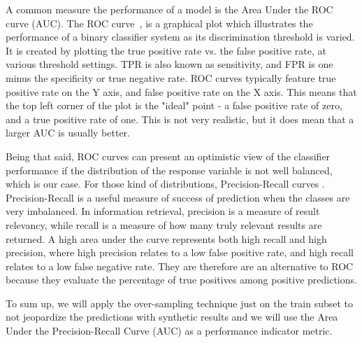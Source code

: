 A common measure the performance of a model is the Area Under the ROC curve (AUC). The ROC curve~\cite{roc}, is a graphical plot which illustrates the performance of a binary classifier system as its discrimination threshold is varied. It is created by plotting the true positive rate vs. the false positive rate, at various threshold settings. TPR is also known as sensitivity, and FPR is one minus the specificity or true negative rate. ROC curves typically feature true positive rate on the Y axis, and false positive rate on the X axis. This means that the top left corner of the plot is the "ideal" point - a false positive rate of zero, and a true positive rate of one. This is not very realistic, but it does mean that a larger AUC is usually better. 

Being that said, ROC curves can present an optimistic view of the classifier performance if the distribution of the response variable is not well balanced, which is our case. For those kind of distributions, Precision-Recall curves \cite{prec_recall}. Precision-Recall is a useful measure of success of prediction when the classes are very imbalanced. In information retrieval, precision is a measure of result relevancy, while recall is a measure of how many truly relevant results are returned. A high area under the curve represents both high recall and high precision, where high precision relates to a low false positive rate, and high recall relates to a low false negative rate. They are therefore are an alternative to ROC because they evaluate the percentage of true positives among positive predictions.

To sum up, we will apply the over-sampling technique just on the train subset to not jeopardize the predictions with synthetic results and we will use the Area Under the Precision-Recall Curve (AUC) as a performance indicator metric. 

\newpage


